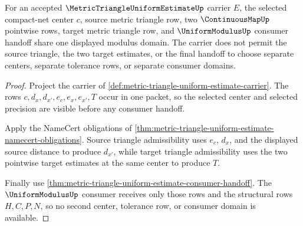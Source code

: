 \begin{theorem}
\label{thm:metric-triangle-uniform-estimate-shared-modulus-domain}
For an accepted $\MetricTriangleUniformEstimateUp$ carrier $E$, the selected compact-net center $c$, source metric triangle row, two $\ContinuousMapUp$ pointwise rows, target metric triangle row, and $\UniformModulusUp$ consumer handoff share one displayed modulus domain. The carrier does not permit the source triangle, the two target estimates, or the final handoff to choose separate centers, separate tolerance rows, or separate consumer domains.
\end{theorem}
\begin{proof}
Project the carrier of \autoref{def:metric-triangle-uniform-estimate-carrier}. The rows $c,d_x,d_{x'},e_c,e_x,e_{x'},T$ occur in one packet, so the selected center and selected precision are visible before any consumer handoff.

Apply the NameCert obligations of \autoref{thm:metric-triangle-uniform-estimate-namecert-obligations}. Source triangle admissibility uses $e_c$, $d_x$, and the displayed source distance to produce $d_{x'}$, while target triangle admissibility uses the two pointwise target estimates at the same center to produce $T$.

Finally use \autoref{thm:metric-triangle-uniform-estimate-consumer-handoff}. The $\UniformModulusUp$ consumer receives only those rows and the structural rows $H,C,P,N$, so no second center, tolerance row, or consumer domain is available.
\end{proof}

